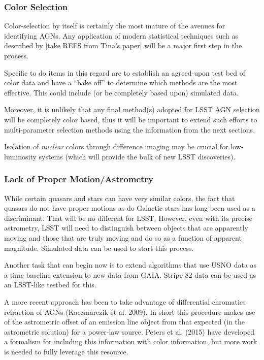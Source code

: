 \subsubsection{Color Selection}

Color-selection by itself is certainly the most mature of the avenues
for identifying AGNs.  Any application of modern statistical
techniques such as described by [take REFS from Tina's paper] will be
a major first step in the process.  

Specific to do items in this regard are to establish an agreed-upon
test bed of color data and have a ``bake off'' to determine which
methods are the most effective.  This could include (or be completely
based upon) simulated data.  

Moreover, it is unlikely that any final method(s) adopted for LSST AGN
selection will be completely color based, thus it will be important to
extend such efforts to multi-parameter selection methods using the
information from the next sections.

Isolation of {\em nuclear} colors through difference imaging may be
crucial for low-luminosity systems (which will provide the bulk of new
LSST discoveries).

\subsubsection{Lack of Proper Motion/Astrometry}

While certain quasars and stars can have very similar colors, the fact
that quasars do not have proper motions as do Galactic stars has long
been used as a discriminant.  That will be no different for LSST.
However, even with its precise astrometry, LSST will need to
distinguish between objects that are apparently moving and those that
are truly moving and do so as a function of apparent magnitude.
Simulated data can be used to start this process.

Another task that can begin now is to extend algorithms that use USNO
data as a time baseline extension to new data from GAIA.  Stripe 82
data can be used as an LSST-like testbed for this.

A more recent approach has been to take advantage of differential
chromatics refraction of AGNs (Kaczmarczik et al. 2009).  In short
this procedure makes use of the astrometric offset of an emission line
object from that expected (in the astrometric solution) for a
power-law source.  Peters et al. (2015) have developed a formalism for
including this information with color information, but more work is
needed to fully leverage this resource.

